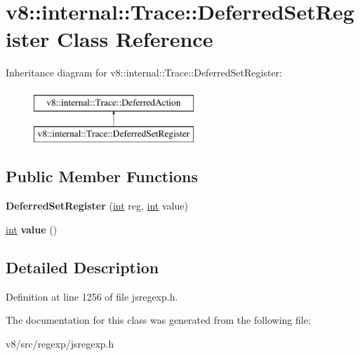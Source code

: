 \hypertarget{classv8_1_1internal_1_1Trace_1_1DeferredSetRegister}{}\section{v8\+:\+:internal\+:\+:Trace\+:\+:Deferred\+Set\+Register Class Reference}
\label{classv8_1_1internal_1_1Trace_1_1DeferredSetRegister}
Inheritance diagram for v8\+:\+:internal\+:\+:Trace\+:\+:Deferred\+Set\+Register\+:\begin{figure}[H]
\begin{center}
\leavevmode
\includegraphics[height=2.000000cm]{classv8_1_1internal_1_1Trace_1_1DeferredSetRegister}
\end{center}
\end{figure}
\subsection*{Public Member Functions}
\begin{DoxyCompactItemize}
\item 
\mbox{\label{classv8_1_1internal_1_1Trace_1_1DeferredSetRegister_a04d1c5f24542781c0fb02301b52a3643}} 
{\bfseries Deferred\+Set\+Register} (\mbox{\hyperlink{classint}{int}} reg, \mbox{\hyperlink{classint}{int}} value)
\item 
\mbox{\label{classv8_1_1internal_1_1Trace_1_1DeferredSetRegister_ac96ce7953b4e0299586de0dcbc674fc6}} 
\mbox{\hyperlink{classint}{int}} {\bfseries value} ()
\end{DoxyCompactItemize}


\subsection{Detailed Description}


Definition at line 1256 of file jsregexp.\+h.



The documentation for this class was generated from the following file\+:\begin{DoxyCompactItemize}
\item 
v8/src/regexp/jsregexp.\+h\end{DoxyCompactItemize}
